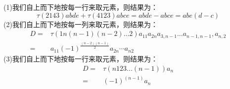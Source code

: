 \begin{solution}{}{}
    (1)我们自上而下地按每一行来取元素，则结果为：
    \[\tau{(2143)}abde+\tau{(4123)abce}=abde-abce=abe(d-c)\]
    (2)我们自上而下地按每一列来取元素，则结果为：\vspace{-5pt}
    \begin{align*}
    D=&\tau{(1n(n-1)(n-2)...2)}a_{11}a_{2n}a_{3,n-1}...a_{n-1,n-1},a_{n,2}\\
    =&a_{11}(-1)^{\frac{(n-2)(n-1)}{2}}a_{2n}\cdots a_{n2}\end{align*}
    (3)我们自上而下地按每一行来取元素，则结果为：\vspace{-5pt}
    \begin{align*}
    D=&\tau{(n123...(n-1))}a_n\\
    =&(-1)^{(n-1)}a_n
    \end{align*}
\end{solution}\newpage
